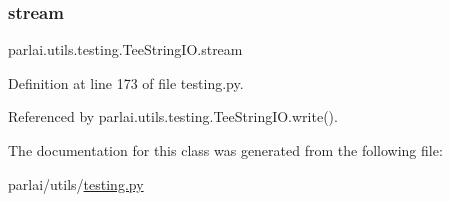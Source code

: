 \subsubsection{\texorpdfstring{stream}{stream}}
{\footnotesize\ttfamily parlai.\+utils.\+testing.\+Tee\+String\+I\+O.\+stream}



Definition at line 173 of file testing.\+py.



Referenced by parlai.\+utils.\+testing.\+Tee\+String\+I\+O.\+write().



The documentation for this class was generated from the following file\+:\begin{DoxyCompactItemize}
\item 
parlai/utils/\hyperlink{testing_8py}{testing.\+py}\end{DoxyCompactItemize}
